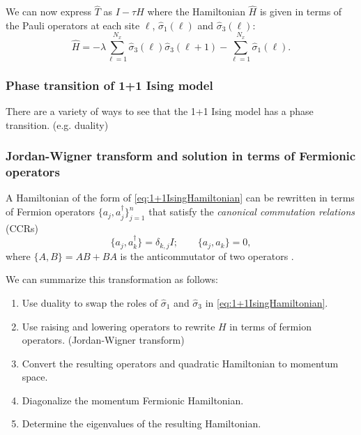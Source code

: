 \documentclass[11pt,reqno]{amsart}
\numberwithin{equation}{section}
\begin{document}
    We can now express $\hat{T}$ as $I- \tau \hat{H}$ where the Hamiltonian $\hat{H}$ is given in terms of the Pauli operators at each site $\ell$, $\hat{\sigma}_1(\ell)$ and $\hat{\sigma}_3(\ell)$:
    \begin{equation}\label{eq:1+1IsingHamiltonian}
    \hat{H}= -\lambda \sum_{\ell=1}^{N_x} \hat{\sigma}_3(\ell)\hat{\sigma}_3(\ell+1) - \sum_{\ell=1}^{N_x} \hat{\sigma}_1(\ell). 
    \end{equation}
    
    \subsubsection{Phase transition of 1+1 Ising model}
    
    There are a variety of ways to see that the 1+1 Ising model has a phase transition.
    (e.g. duality) \cite{KogutGaugeSummary}
    
    \subsubsection{Jordan-Wigner transform and solution in terms of Fermionic operators}
    
    A Hamiltonian of the form of \cref{eq:1+1IsingHamiltonian} can be rewritten in terms of Fermion operators $\{a_j,a^\dagger_j\}_{j=1}^n$ that satisfy the \emph{canonical commutation relations} (CCRs) 
    \[ \{a_j,a_k^\dagger \} = \delta_{k,j}I; \qquad \{a_j,a_k \} =0, \]
    where $\{A,B\} = AB + BA$ is the anticommutator of two operators \cite{KogutGaugeSummary,nielsen_fermions,SchultzMattisLieb64}.
    
    We can summarize this transformation as follows:
    \begin{enumerate}
    	\item Use duality to swap the roles of $\hat{\sigma}_1$ and $\hat{\sigma}_3$ in \cref{eq:1+1IsingHamiltonian}.
    	\item Use raising and lowering operators to rewrite $H$ in terms of fermion operators. (Jordan-Wigner transform)
    	\item Convert the resulting operators and quadratic Hamiltonian to momentum space.
    	\item Diagonalize the momentum Fermionic Hamiltonian.
    	\item Determine the eigenvalues of the resulting Hamiltonian.
    \end{enumerate}
	
\end{document}
